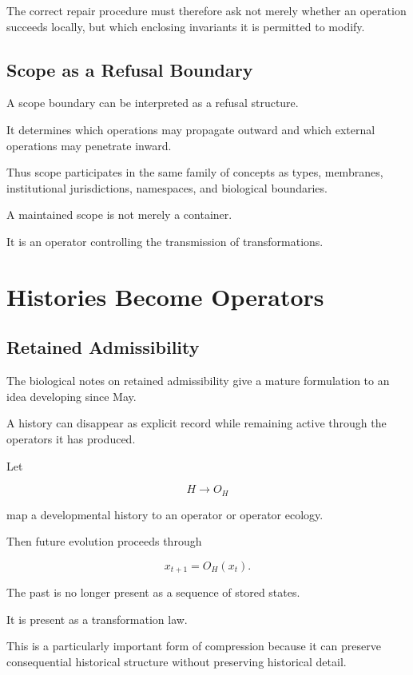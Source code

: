 \documentclass[11pt]{article}
\theoremstyle{remark}
\begin{document}
The correct repair procedure must therefore ask not merely whether an operation succeeds locally, but which enclosing invariants it is permitted to modify.

\subsection{Scope as a Refusal Boundary}

A scope boundary can be interpreted as a refusal structure.

It determines which operations may propagate outward and which external operations may penetrate inward.

Thus scope participates in the same family of concepts as types, membranes, institutional jurisdictions, namespaces, and biological boundaries.

A maintained scope is not merely a container.

It is an operator controlling the transmission of transformations.

\section{Histories Become Operators}

\subsection{Retained Admissibility}

The biological notes on retained admissibility give a mature formulation to an idea developing since May.

A history can disappear as explicit record while remaining active through the operators it has produced.

Let

\begin{equation}
H
\longrightarrow
O_H
\end{equation}

map a developmental history to an operator or operator ecology.

Then future evolution proceeds through

\begin{equation}
x_{t+1}=O_H(x_t).
\end{equation}

The past is no longer present as a sequence of stored states.

It is present as a transformation law.

This is a particularly important form of compression because it can preserve consequential historical structure without preserving historical detail.
\end{document}
